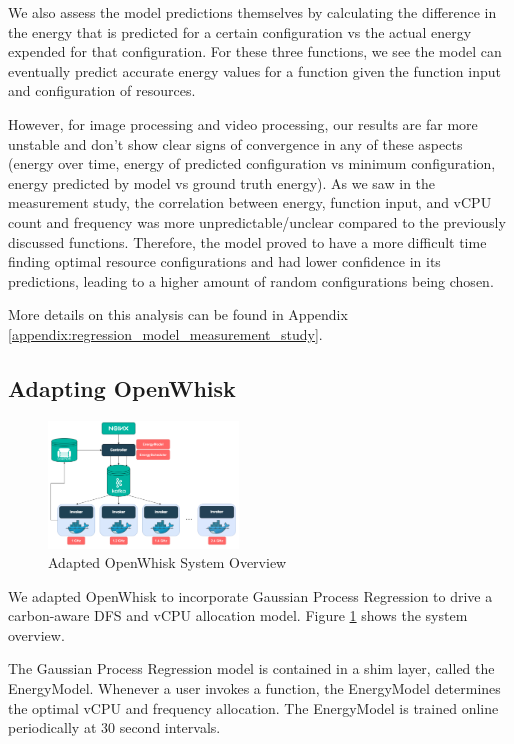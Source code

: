 \documentclass[times, 10pt,twocolumn]{article}
\begin{document}
We also assess the model predictions themselves by calculating the difference in the energy that is predicted for a certain configuration vs the actual energy expended for that configuration. For these three functions, we see the model can eventually predict accurate energy values for a function given the function input and configuration of resources.

However, for image processing and video processing, our results are far more unstable and don't show clear signs of convergence in any of these aspects (energy over time, energy of predicted configuration vs minimum configuration, energy predicted by model vs ground truth energy). As we saw in the measurement study, the correlation between energy, function input, and vCPU count and frequency was more unpredictable/unclear compared to the previously discussed functions. Therefore, the model proved to have a more difficult time finding optimal resource configurations and had lower confidence in its predictions, leading to a higher amount of random configurations being chosen. 

More details on this analysis can be found in Appendix \ref{appendix:regression_model_measurement_study}.


\subsection{Adapting OpenWhisk}

\begin{figure}[ht]
   \centering
   \includegraphics[width=0.45\textwidth]{imgs/Adapted_OW_System_Overview.png}
   \caption{Adapted OpenWhisk System Overview}
   \label{fig:adapted_ow_system_overview}
 \end{figure}

We adapted OpenWhisk to incorporate Gaussian Process Regression to drive a carbon-aware DFS and vCPU allocation model. Figure \ref{fig:adapted_ow_system_overview} shows the system overview.

The Gaussian Process Regression model is contained in a shim layer, called the EnergyModel. Whenever a user invokes a function, the EnergyModel determines the optimal vCPU and frequency allocation. The EnergyModel is trained online periodically at 30 second intervals.
\end{document}
